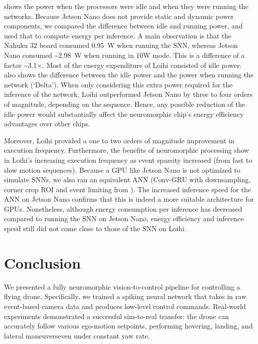  shows the power when the processors were idle and when they were running the networks. Because Jetson Nano does not provide static and dynamic power components, we compared the difference between idle and running power, and used that to compute energy per inference. A main observation is that the Nahuku 32 board consumed 0.95~W when running the SNN, whereas Jetson Nano consumed \textasciitilde{}2.98~W when running in 10W mode. This is a difference of a factor \textasciitilde{}3.1$\times$. Most of the energy expenditure of Loihi consisted of idle power.  also shows the difference between the idle power and the power when running the network (`Delta'). When only considering this extra power required for the inference of the network, Loihi outperformed Jetson Nano by three to four orders of magnitude, depending on the sequence. Hence, any possible reduction of the idle power would substantially affect the neuromorphic chip's energy efficiency advantages over other chips. 

Moreover, Loihi provided a one to two orders of magnitude improvement in execution frequency. Furthermore, the benefits of neuromorphic processing show in Loihi's increasing execution frequency as event sparsity increased (from fast to slow motion sequences).
Because a GPU like Jetson Nano is not optimized to simulate SNNs, we also ran an equivalent ANN (Conv-GRU with downsampling, corner crop ROI and event limiting from ). The increased inference speed for the ANN on Jetson Nano confirms that this is indeed a more suitable architecture for GPUs. Nonetheless, although energy consumption per inference has decreased compared to running the SNN on Jetson Nano, energy efficiency and inference speed still did not come close to those of the SNN on Loihi.

\section{Conclusion}

We presented a fully neuromorphic vision-to-control pipeline for controlling a flying drone. Specifically, we trained a spiking neural network that takes in raw event-based camera data and produces low-level control commands. Real-world experiments demonstrated a successful sim-to-real transfer: the drone can accurately follow various ego-motion setpoints, performing hovering, landing, and lateral maneuvers\textemdash even under constant yaw rate. 

